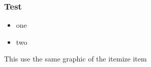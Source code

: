 \documentclass{beamer}
\begin{document}
    \begin{frame}
        \frametitle{Test}
        \begin{itemize}
            \item one
            \item two
        \end{itemize}

        \leavevmode{} This use the same graphic of the itemize item

    \end{frame}
\end{document}

